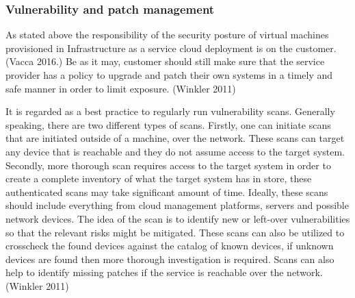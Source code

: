 \documentclass{article}
\begin{document}
\subsubsection{Vulnerability and patch management}
As stated above the responsibility of the security posture of virtual machines provisioned in Infrastructure as a service cloud deployment is on the customer. (Vacca 2016.) Be as it may, customer should still make sure that the service provider has a policy to upgrade and patch their own systems in a timely and safe manner in order to limit exposure. (Winkler 2011)
\par
It is regarded as a best practice to regularly run vulnerability scans. Generally speaking, there are two different types of scans. Firstly, one can initiate scans that are initiated outside of a machine, over the network. These scans can target any device that is reachable and they do not assume access to the target system. Secondly, more thorough scan requires access to the target system in order to create a complete inventory of what the target system has in store, these authenticated scans may take significant amount of time. Ideally, these scans should include everything from cloud management platforms, servers and possible network devices. The idea of the scan is to identify new or left-over vulnerabilities so that the relevant risks might be mitigated. These scans can also be utilized to crosscheck the found devices against the catalog of known devices, if unknown devices are found then more thorough investigation is required. Scans can also help to identify missing patches if the service is reachable over the network. (Winkler 2011)
\end{document}
